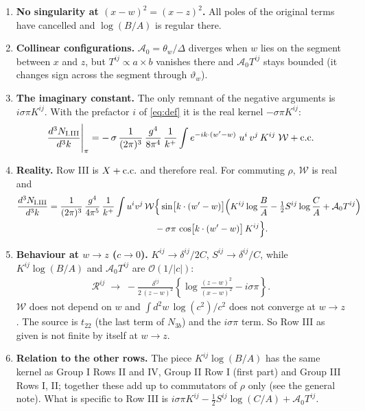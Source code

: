 \documentclass[10pt]{article}
\numberwithin{equation}{section}
\begin{document}
\begin{enumerate}
\item \textbf{No singularity at $(x-w)^{2}=(x-z)^{2}$.} All poles of the original terms have cancelled and $\log(B/A)$ is regular there.
\item \textbf{Collinear configurations.} $\mathcal{A}_{0}=\theta_{w}/\Delta$ diverges when $w$ lies on the segment between $x$ and $z$, but $T^{ij}\propto a\times b$ vanishes there and $\mathcal{A}_{0}T^{ij}$ stays bounded (it changes sign across the segment through $\vartheta_{w}$).
\item \textbf{The imaginary constant.} The only remnant of the negative arguments is $i\sigma\pi K^{ij}$. With the prefactor $i$ of \eqref{eq:def} it is the real kernel $-\sigma\pi K^{ij}$:
\begin{align}
\frac{d^{3}N_{\rm I.III}}{d^{3}k}\Bigg|_{\pi}=-\,\sigma\,\frac{1}{(2\pi)^{3}}\,\frac{g^{4}}{8\pi^{4}}\,\frac{1}{k^{+}}\int e^{-ik\cdot(w'-w)}\;u^{i}\,v^{j}\,K^{ij}\;\mathcal{W}+{\rm c.c.}
\end{align}
\item \textbf{Reality.} Row III is $X+{\rm c.c.}$ and therefore real. For commuting $\rho$, $\mathcal{W}$ is real and
\begin{align}
\frac{d^{3}N_{\rm I.III}}{d^{3}k}&=\frac{1}{(2\pi)^{3}}\,\frac{g^{4}}{4\pi^{5}}\,\frac{1}{k^{+}}\int u^{i}v^{j}\,\mathcal{W}
\Big\{\sin\!\big[k\cdot(w'-w)\big]\Big(K^{ij}\log\frac{B}{A}-\tfrac12S^{ij}\log\frac{C}{A}+\mathcal{A}_{0}T^{ij}\Big)\notag\\
&\hspace{4.2cm}-\sigma\pi\,\cos\!\big[k\cdot(w'-w)\big]\,K^{ij}\Big\}.
\end{align}
\item \textbf{Behaviour at $w\to z$ ($c\to0$).} $K^{ij}\to\delta^{ij}/2C$, $S^{ij}\to\delta^{ij}/C$, while $K^{ij}\log(B/A)$ and $\mathcal{A}_{0}T^{ij}$ are $\mathcal{O}(1/|c|)$:
\begin{align}
\mathcal{R}^{ij}\;\longrightarrow\;-\frac{\delta^{ij}}{2\,(z-w)^{2}}\left\{\log\frac{(z-w)^{2}}{(x-w)^{2}}-i\sigma\pi\right\}.
\end{align}
$\mathcal{W}$ does not depend on $w$ and $\int d^{2}w\,\log(c^{2})/c^{2}$ does not converge at $w\to z$. The source is $t_{22}$ (the last term of $N_{3b}$) and the $i\sigma\pi$ term. So Row III as given is not finite by itself at $w\to z$.
\item \textbf{Relation to the other rows.} The piece $K^{ij}\log(B/A)$ has the same kernel as Group I Rows II and IV, Group II Row I (first part) and Group III Rows I, II; together these add up to commutators of $\rho$ only (see the general note). What is specific to Row III is $i\sigma\pi K^{ij}-\tfrac12S^{ij}\log(C/A)+\mathcal{A}_{0}T^{ij}$.
\end{enumerate}
\end{document}
